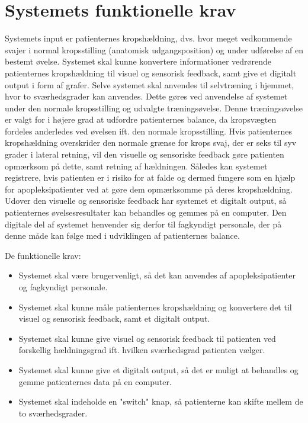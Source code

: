 \section{Systemets funktionelle krav}
Systemets input er patienternes kropshældning, dvs. hvor meget vedkommende svajer i normal kropsstilling (anatomisk udgangsposition) og under udførelse af en bestemt øvelse. Systemet skal kunne konvertere informationer vedrørende patienternes kropshældning til visuel og sensorisk feedback, samt give et digitalt output i form af grafer. Selve systemet skal anvendes til selvtræning i hjemmet, hvor to sværhedsgrader kan anvendes. Dette gøres ved anvendelse af systemet  under den normale kropsstilling og udvalgte træningsøvelse. Denne træningsøvelse er valgt for i højere grad at udfordre patienternes balance, da kropsvægten fordeles anderledes ved øvelsen ift. den normale kropsstilling. Hvis patienternes kropshældning overskrider den normale grænse for krops svaj, der er seks til syv grader i lateral retning, vil den visuelle og sensoriske feedback gøre patienten opmærksom på dette, samt retning af hældningen. Således kan systemet registrere, hvis patienten er i risiko for at falde og dermed fungere som en hjælp for apopleksipatienter ved at gøre dem opmærksomme på deres kropshældning. Udover den visuelle og sensoriske feedback har systemet et digitalt output, så patienternes øvelsesresultater kan behandles og gemmes på en computer. Den digitale del af systemet henvender sig derfor til fagkyndigt personale, der på denne måde kan følge med i udviklingen af patienternes balance. 


De funktionelle krav:
\begin{itemize}
\item Systemet skal være brugervenligt, så det kan anvendes af apopleksipatienter og fagkyndigt personale.
\item Systemet skal kunne måle patienternes kropshældning og konvertere det til visuel og sensorisk feedback, samt et digitalt output.
\item Systemet skal kunne give visuel og sensorisk feedback til patienten ved forskellig hældningsgrad ift. hvilken sværhedsgrad patienten vælger.
\item Systemet skal kunne give et digitalt output, så det er muligt at behandles og gemme patienternes data på en computer.
\item Systemet skal indeholde en "switch" knap, så patienterne kan skifte mellem de to sværhedsgrader.
\end{itemize}

